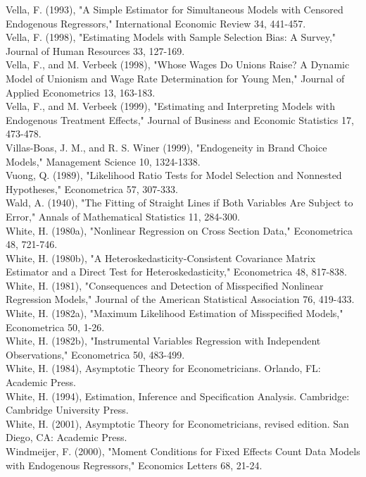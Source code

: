 \documentclass[10pt]{article}
\begin{document}
Vella, F. (1993), "A Simple Estimator for Simultaneous Models with Censored Endogenous Regressors," International Economic Review 34, 441-457.\\
Vella, F. (1998), "Estimating Models with Sample Selection Bias: A Survey," Journal of Human Resources 33, 127-169.\\
Vella, F., and M. Verbeek (1998), "Whose Wages Do Unions Raise? A Dynamic Model of Unionism and Wage Rate Determination for Young Men," Journal of Applied Econometrics 13, 163-183.\\
Vella, F., and M. Verbeek (1999), "Estimating and Interpreting Models with Endogenous Treatment Effects," Journal of Business and Economic Statistics 17, 473-478.\\
Villas-Boas, J. M., and R. S. Winer (1999), "Endogeneity in Brand Choice Models," Management Science 10, 1324-1338.\\
Vuong, Q. (1989), "Likelihood Ratio Tests for Model Selection and Nonnested Hypotheses," Econometrica 57, 307-333.\\
Wald, A. (1940), "The Fitting of Straight Lines if Both Variables Are Subject to Error," Annals of Mathematical Statistics 11, 284-300.\\
White, H. (1980a), "Nonlinear Regression on Cross Section Data," Econometrica 48, 721-746.\\
White, H. (1980b), "A Heteroskedasticity-Consistent Covariance Matrix Estimator and a Direct Test for Heteroskedasticity," Econometrica 48, 817-838.\\
White, H. (1981), "Consequences and Detection of Misspecified Nonlinear Regression Models," Journal of the American Statistical Association 76, 419-433.\\
White, H. (1982a), "Maximum Likelihood Estimation of Misspecified Models," Econometrica 50, 1-26.\\
White, H. (1982b), "Instrumental Variables Regression with Independent Observations," Econometrica 50, 483-499.\\
White, H. (1984), Asymptotic Theory for Econometricians. Orlando, FL: Academic Press.\\
White, H. (1994), Estimation, Inference and Specification Analysis. Cambridge: Cambridge University Press.\\
White, H. (2001), Asymptotic Theory for Econometricians, revised edition. San Diego, CA: Academic Press.\\
Windmeijer, F. (2000), "Moment Conditions for Fixed Effects Count Data Models with Endogenous Regressors," Economics Letters 68, 21-24.\\
\end{document}
